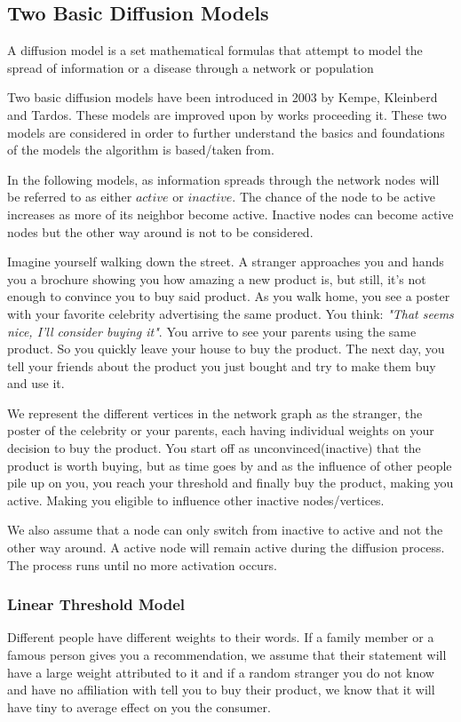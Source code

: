 	

\subsection{Two Basic Diffusion Models}
A diffusion model is a set mathematical formulas that attempt to model the spread of information or a disease through a network or population

Two basic diffusion models have been introduced in 2003 by Kempe, Kleinberd and Tardos.\cite{Kempe} These models are improved upon by works proceeding it. These two models are considered in order to further understand the basics and foundations of the models the algorithm is based/taken from.


In the following models, as information spreads through the network nodes will be referred to as either $active$ or $inactive$. The chance of the node to be active increases as more of its neighbor become active. Inactive nodes can become active nodes but the other way around is not to be considered. 

Imagine yourself walking down the street. A stranger approaches you and hands you a brochure showing you how amazing a new product is, but still, it's not enough to convince you to buy said product. As you walk home, you see a poster with your favorite celebrity advertising the same product. You think: \textit{"That seems nice, I'll consider buying it"}. You arrive to see your parents using the same product. So you quickly leave your house to buy the product. The next day, you tell your friends about the product you just bought and try to make them buy and use it.

We represent the different vertices in the network graph as the stranger, the poster of the celebrity or your parents, each having individual weights on your decision to buy the product. You start off as unconvinced(inactive) that the product is worth buying, but as time goes by and as the influence of other people pile up on you, you reach your threshold and finally buy the product, making you active. Making you eligible to influence other inactive nodes/vertices.

We also assume that a node can only switch from inactive to active and not the other way around. A active node will remain active during the diffusion process. The process runs until no more activation occurs.\cite{Shakarian:2012:LSN:2456719.2457081} 
\subsubsection{Linear Threshold Model}
Different people have different weights to their words. If a family member or a famous person gives you a recommendation, we assume that their statement will have a large weight attributed to it and if a random stranger you do not know and have no affiliation with tell you to buy their product, we know that it will have tiny to average effect on you the consumer.

